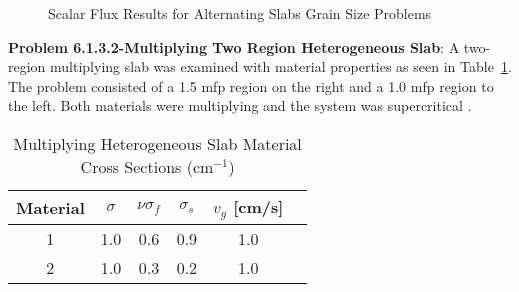 %
%
\clearpage

\begin{figure}[!htbp]
	\centering
	\resizebox{0.75\textwidth}{!}{
	
	}
	\caption{Scalar Flux Results for Alternating Slabs Grain Size Problems}
	\label{fig:GrainScalarFlux}
\end{figure}

\textbf{Problem 6.1.3.2-Multiplying Two Region Heterogeneous Slab}:  A two-region multiplying slab was examined with material properties as seen in Table~\ref{table:BetzlerHeteroMult}. The problem consisted of a 1.5 mfp region on the right and a 1.0 mfp region to the left. Both materials were multiplying and the system was supercritical \cite{kornreich_greens_1997}.

\begin{table}[H]
    \centering
    \caption{Multiplying Heterogeneous Slab Material Cross Sections (cm$^{-1}$)}
\label{table:BetzlerHeteroMult}
    \begin{tabular}{*6c}
        \toprule
	Material & $\sigma$ & $\nu \sigma_{f}$ & $\sigma_{s}$ & $v_{g}$ [cm/s] \\ 
        \midrule
	1 & 1.0 & 0.6 & 0.9 & 1.0 \\
	2 & 1.0 & 0.3 & 0.2 & 1.0 \\ 
        \bottomrule
    \end{tabular}
\end{table}

